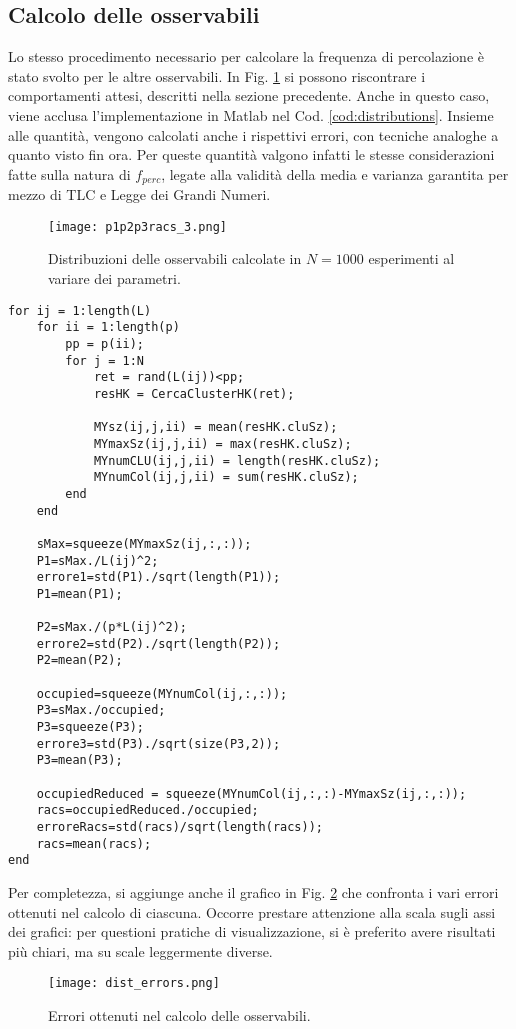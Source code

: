 \subsection*{Calcolo delle osservabili}
Lo stesso procedimento necessario per calcolare la frequenza di percolazione è stato svolto per 
le altre osservabili. In Fig. \ref{fig:distributions} si possono riscontrare i comportamenti 
attesi, descritti nella sezione precedente.
Anche in questo caso, viene acclusa l'implementazione in Matlab nel Cod. \ref{cod:distributions}.
Insieme alle quantità, vengono calcolati anche i rispettivi errori, con tecniche analoghe a quanto visto 
fin ora. Per queste quantità valgono infatti le stesse considerazioni fatte sulla natura di $f_{perc}$,
legate alla validità della media e varianza garantita per mezzo di 
TLC e Legge dei Grandi Numeri.
\begin{figure}[ht]
    \texttt{[image: p1p2p3racs\_3.png]}
    \caption{Distribuzioni delle osservabili calcolate in $N=1000$ esperimenti al variare dei parametri.}
    \label{fig:distributions}
\end{figure}
\begin{lstlisting}[caption={Porzione di codice per il calcolo delle osservabili.},label={cod:distributions}]
for ij = 1:length(L)
    for ii = 1:length(p)
        pp = p(ii);
        for j = 1:N
            ret = rand(L(ij))<pp;
            resHK = CercaClusterHK(ret);

            MYsz(ij,j,ii) = mean(resHK.cluSz);
            MYmaxSz(ij,j,ii) = max(resHK.cluSz);
            MYnumCLU(ij,j,ii) = length(resHK.cluSz);
            MYnumCol(ij,j,ii) = sum(resHK.cluSz);
        end
    end
   
    sMax=squeeze(MYmaxSz(ij,:,:));
    P1=sMax./L(ij)^2;
    errore1=std(P1)./sqrt(length(P1));
    P1=mean(P1);

    P2=sMax./(p*L(ij)^2);
    errore2=std(P2)./sqrt(length(P2));
    P2=mean(P2);

    occupied=squeeze(MYnumCol(ij,:,:));
    P3=sMax./occupied;
    P3=squeeze(P3);
    errore3=std(P3)./sqrt(size(P3,2));
    P3=mean(P3);

    occupiedReduced = squeeze(MYnumCol(ij,:,:)-MYmaxSz(ij,:,:));
    racs=occupiedReduced./occupied;
    erroreRacs=std(racs)/sqrt(length(racs));
    racs=mean(racs);
end
\end{lstlisting}

Per completezza, si aggiunge anche il grafico in Fig. \ref{fig:dist_errors} che confronta i vari errori 
ottenuti nel calcolo di ciascuna. Occorre prestare attenzione alla scala
sugli assi dei grafici: per questioni pratiche di visualizzazione, si è preferito
avere risultati più chiari, ma su scale leggermente diverse.
\begin{figure}[ht]
    \texttt{[image: dist\_errors.png]}
    \caption{Errori ottenuti nel calcolo delle osservabili.}
    \label{fig:dist_errors}
\end{figure}


